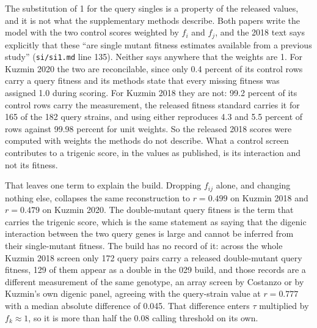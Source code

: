 The substitution of 1 for the query singles is a property of the released values, and it
is not what the supplementary methods describe. Both papers write the model with the two
control scores weighted by $f_i$ and $f_j$, and the 2018 text says explicitly that these
``are single mutant fitness estimates available from a previous study''
(\texttt{si/si1.md} line 135). Neither says anywhere that the weights are 1. For Kuzmin
2020 the two are reconcilable, since only 0.4 percent of its control rows carry a query
fitness and its methods state that every missing fitness was assigned 1.0 during scoring.
For Kuzmin 2018 they are not: 99.2 percent of its control rows carry the measurement, the
released fitness standard carries it for 165 of the 182 query strains, and using either
reproduces 4.3 and 5.5 percent of rows against 99.98 percent for unit weights. So the
released 2018 scores were computed with weights the methods do not describe. What a
control screen contributes to a trigenic score, in the values as published, is its
interaction and not its fitness.

\begin{table}[htbp]
\centering
\footnotesize
\caption{The trigenic identity inside one screen, matched by array strain identifier.
The first row of each pair takes every term from the screen that measured it. The
second drops the double-mutant query fitness $f_{ij}$, which is the only change made,
and is what a closure over the database is forced into because that measurement is not
a record. Generated by \texttt{s3\_closure\_trigenic\_within\_screen.py}.}
\label{tab:trigenic-within}

\end{table}

That leaves one term to explain the build. Dropping $f_{ij}$ alone, and changing nothing
else, collapses the same reconstruction to $r = 0.499$ on Kuzmin 2018 and $r = 0.479$ on
Kuzmin 2020. The double-mutant query fitness is the
term that carries the trigenic score, which is the same statement as saying that the
digenic interaction between the two query genes is large and cannot be inferred from
their single-mutant fitness. The build has no record of it: across the whole Kuzmin
2018 screen only 172 query pairs carry a released double-mutant query fitness, 129 of
them appear as a double in the 029 build, and those records are a different
measurement of the same genotype, an array screen by Costanzo or by Kuzmin's own
digenic panel, agreeing with the query-strain value at $r = 0.777$ with a median
absolute difference of 0.045. That difference enters $\tau$ multiplied by $f_k \approx 1$,
so it is more than half the 0.08 calling threshold on its own.
